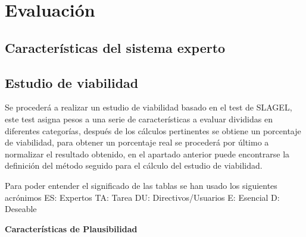 \chapter{Evaluación}
\label{cap:Evaluación}

\section{Características del sistema experto}



\section{Estudio de viabilidad}
Se procederá a realizar un estudio de viabilidad basado en el test de SLAGEL, este test
 asigna pesos a una serie de características a evaluar divididas en diferentes categorías,
 después de los cálculos pertinentes se obtiene un porcentaje de viabilidad, para obtener
 un porcentaje real se procederá por último a normalizar el resultado obtenido, en el apartado
 anterior puede encontrarse la definición del método seguido para el cálculo del estudio de
 viabilidad.

Para poder entender el significado de las tablas se han usado los siguientes acrónimos
 ES: Expertos TA: Tarea DU: Directivos/Usuarios E: Esencial D: Deseable

\textbf{Características de Plausibilidad}

